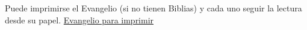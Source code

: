 Puede imprimirse el Evangelio (si no tienen Biblias) y cada uno seguir la lectura desde su papel. \href{¡link!}{\color{amarillo}Evangelio para imprimir}
\hfill \\ \hfill
    
\hfill \\ \hfill
    

\hfill \\ \hfill
    
